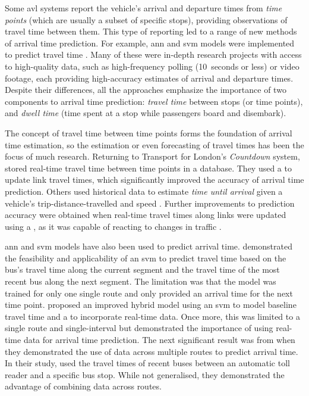 Some \gls{avl} systems report the vehicle's arrival and departure times from \emph{time points} (which are usually a subset of specific stops), providing observations of travel time between them. This type of reporting led to a range of new methods of arrival time prediction. For example, \gls{ann} and \gls{svm} models were implemented to predict travel time \citep{Jeong_2005,Shalaby_2004,Yu_2011,Cats_2015,Cats_2016,Yin_2017}. Many of these were in-depth research projects with access to high-quality data, such as high-frequency polling (10~seconds or less) or video footage, each providing high-accuracy estimates of arrival and departure times. Despite their differences, all the approaches emphasize the importance of two components to arrival time prediction: \emph{travel time} between stops (or time points), and \emph{dwell time} (time spent at a stop while passengers board and disembark).


The concept of travel time between time points forms the foundation of arrival time estimation, so the estimation or even forecasting of travel times has been the focus of much research. Returning to Transport for London's \emph{Countdown} system, \citet{Reinhoudt_1997} stored real-time travel time between time points in a database. They used a \kf{} to update link travel times, which significantly improved the accuracy of arrival time prediction. Others used historical data to estimate \emph{time until arrival} given a vehicle's trip-distance-travelled and speed \citep{Wall_1999,Dailey_2001,Cathey_2003}. Further improvements to prediction accuracy were obtained when real-time travel times along links were updated using a \kf{}, as it was capable of reacting to changes in traffic \citep{Shalaby_2004}.


\Gls{ann} and \gls{svm} models have also been used to predict arrival time.  demonstrated the feasibility and applicability of an \gls{svm} to predict travel time based on the bus's travel time along the current segment and the travel time of the most recent bus along the next segment. The limitation was that the model was trained for only one single route and only provided an arrival time for the next time point. \citet{Yu_2010} proposed an improved hybrid model using an \gls{svm} to model baseline travel time and a \kf{} to incorporate real-time data. Once more, this was limited to a single route and single-interval but demonstrated the importance of using real-time data for arrival time prediction. The next significant result was from \citet{Yu_2011} when they demonstrated the use of data across multiple routes to predict arrival time. In their study, \citeauthor{Yu_2011} used the travel times of recent buses between an automatic toll reader and a specific bus stop. While not generalised, they demonstrated the advantage of combining data across routes.


